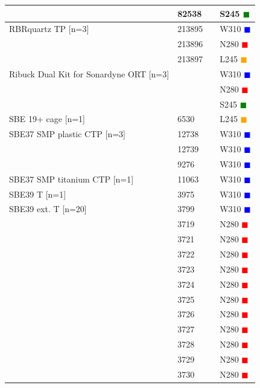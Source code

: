 \documentclass{article}
\begin{document}
\begin{tabularx}{\linewidth}{|X|l|l|X|}
 & 82538 &  & S245 \textcolor{green}{$\blacksquare$} \\ \hline
RBRquartz TP [n=3] & 213895 &  & W310 \textcolor{blue}{$\blacksquare$} \\ \hline
 & 213896 &  & N280 \textcolor{red}{$\blacksquare$} \\ \hline
 & 213897 &  & L245 \textcolor{orange}{$\blacksquare$} \\ \hline
Ribuck Dual Kit for Sonardyne ORT [n=3] &  &  & W310 \textcolor{blue}{$\blacksquare$} \\ \hline
 &  &  & N280 \textcolor{red}{$\blacksquare$} \\ \hline
 &  &  & S245 \textcolor{green}{$\blacksquare$} \\ \hline
SBE 19+ cage [n=1] & 6530 &  & L245 \textcolor{orange}{$\blacksquare$} \\ \hline
SBE37 SMP plastic CTP [n=3] & 12738 &  & W310 \textcolor{blue}{$\blacksquare$} \\ \hline
 & 12739 &  & W310 \textcolor{blue}{$\blacksquare$} \\ \hline
 & 9276 &  & W310 \textcolor{blue}{$\blacksquare$} \\ \hline
SBE37 SMP titanium CTP [n=1] & 11063 &  & W310 \textcolor{blue}{$\blacksquare$} \\ \hline
SBE39 T [n=1] & 3975 &  & W310 \textcolor{blue}{$\blacksquare$} \\ \hline
SBE39 ext. T [n=20] & 3799 &  & W310 \textcolor{blue}{$\blacksquare$} \\ \hline
 & 3719 &  & N280 \textcolor{red}{$\blacksquare$} \\ \hline
 & 3721 &  & N280 \textcolor{red}{$\blacksquare$} \\ \hline
 & 3722 &  & N280 \textcolor{red}{$\blacksquare$} \\ \hline
 & 3723 &  & N280 \textcolor{red}{$\blacksquare$} \\ \hline
 & 3724 &  & N280 \textcolor{red}{$\blacksquare$} \\ \hline
 & 3725 &  & N280 \textcolor{red}{$\blacksquare$} \\ \hline
 & 3726 &  & N280 \textcolor{red}{$\blacksquare$} \\ \hline
 & 3727 &  & N280 \textcolor{red}{$\blacksquare$} \\ \hline
 & 3728 &  & N280 \textcolor{red}{$\blacksquare$} \\ \hline
 & 3729 &  & N280 \textcolor{red}{$\blacksquare$} \\ \hline
 & 3730 &  & N280 \textcolor{red}{$\blacksquare$} \\ \hline

\end{tabularx}
\end{document}
